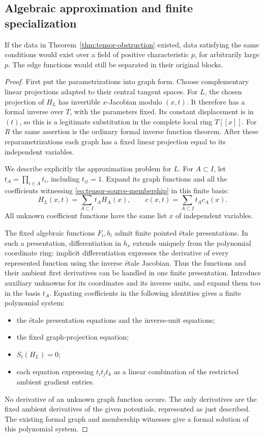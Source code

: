 \subsection{Algebraic approximation and finite specialization}

\begin{lemma}\label{lem:tensor-reduction}
If the data in Theorem~\ref{thm:tensor-obstruction} existed, data satisfying
the same conditions would exist over a field of positive characteristic
\(p\), for arbitrarily large \(p\).  The edge functions would still be
separated in their original blocks.
\end{lemma}

\begin{proof}
First put the parametrizations into graph form.  Choose complementary
linear projections adapted to their central tangent spaces.  For \(L\),
the chosen projection of \(H_L\) has invertible \(x\)-Jacobian modulo
\((x,t)\).  It therefore has a formal inverse over \(T\), with the parameters
fixed.  Its constant displacement is in \((t)\), so this is a legitimate
substitution in the complete local ring \(T[[x]]\).
For \(R\) the same assertion is the ordinary formal inverse function
theorem.  After these reparametrizations each graph has a fixed linear
projection equal to its independent variables.

We describe explicitly the approximation problem for \(L\).
For \(A\subset I\), let \(t_A=\prod_{i\in A}t_i\), including \(t_\varnothing=1\).
Expand its graph functions and all the coefficients witnessing
\eqref{eq:tensor-source-membership} in this finite basis:
\[
 H_L(x,t)=\sum_{A\subset I}t_A H_A(x),\qquad
 c(x,t)=\sum_{A\subset I}t_A c_A(x).
\]
All unknown coefficient functions have the same list \(x\) of independent
variables.

The fixed algebraic functions \(F_i,b_i\) admit finite pointed étale
presentations.  In such a presentation, differentiation in \(h_\nu\)
extends uniquely from the polynomial coordinate ring: implicit
differentiation expresses the derivative of every represented function
using the inverse étale Jacobian.  Thus the functions and their ambient
first derivatives can be handled in one finite presentation.  Introduce
auxiliary unknowns for its coordinates and its inverse units, and expand
them too in the basis \(t_A\).  Equating coefficients in the following
identities gives a finite polynomial system:
\begin{itemize}
 \item the étale presentation equations and the inverse-unit equations;
 \item the fixed graph-projection equation;
 \item \(S_t(H_L)=0\);
 \item each equation expressing \(t_i t_j t_k\) as a linear combination
       of the restricted ambient gradient entries.
\end{itemize}
No derivative of an unknown graph function occurs.  The only derivatives
are the fixed ambient derivatives of the given potentials, represented
as just described.  The existing formal graph and membership witnesses
give a formal solution of this polynomial system.


\end{proof}
